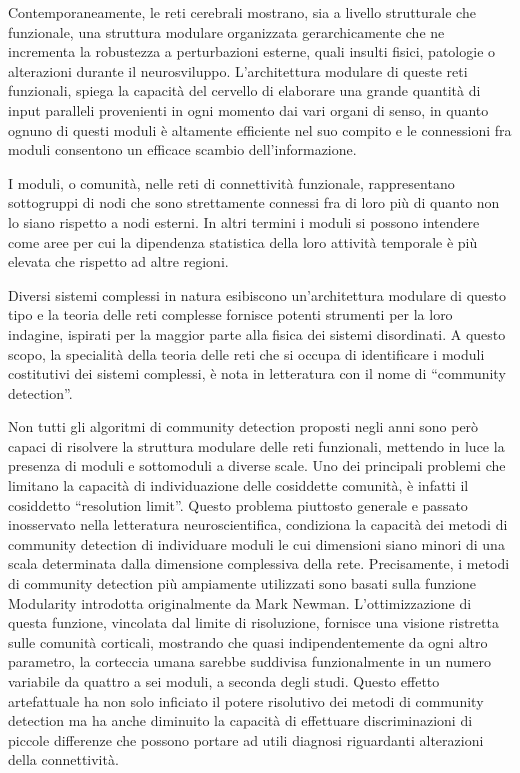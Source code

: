 Contemporaneamente, le reti cerebrali mostrano, sia a livello strutturale che funzionale, una struttura modulare organizzata gerarchicamente che ne incrementa la robustezza a perturbazioni esterne, quali insulti fisici, patologie o alterazioni durante il neurosviluppo.
L'architettura modulare di queste reti funzionali, spiega la capacità del cervello di elaborare una grande quantità di input paralleli provenienti in ogni momento dai vari organi di senso, in quanto ognuno di questi moduli è altamente efficiente nel suo compito e le connessioni fra moduli consentono un efficace scambio dell'informazione.

I moduli, o comunità, nelle reti di connettività funzionale, rappresentano sottogruppi di nodi che sono strettamente connessi fra di loro più di quanto non lo siano rispetto a nodi esterni.
In altri termini i moduli si possono intendere come aree per cui la dipendenza statistica della loro attività temporale è più elevata che rispetto ad altre regioni.

Diversi sistemi complessi in natura esibiscono un'architettura modulare di questo tipo e la teoria delle reti complesse fornisce potenti strumenti per la loro indagine, ispirati per la maggior parte alla fisica dei sistemi disordinati.
A questo scopo, la specialità della teoria delle reti che si occupa di identificare i moduli costitutivi dei sistemi complessi, è nota in letteratura con il nome di ``community detection''.

Non tutti gli algoritmi di community detection proposti negli anni sono però capaci di risolvere la struttura modulare delle reti funzionali, mettendo in luce la presenza di moduli e sottomoduli a diverse scale.
Uno dei principali problemi che limitano la capacità di individuazione delle cosiddette comunità, è infatti il cosiddetto ``resolution limit''.
Questo problema piuttosto generale e passato inosservato nella letteratura neuroscientifica, condiziona la capacità dei metodi di community detection di individuare moduli le cui dimensioni siano minori di una scala determinata dalla dimensione complessiva della rete.
Precisamente, i metodi di community detection più ampiamente utilizzati sono basati sulla funzione Modularity introdotta originalmente da Mark Newman.
L'ottimizzazione di questa funzione, vincolata dal limite di risoluzione, fornisce una visione ristretta sulle comunità corticali, mostrando che quasi indipendentemente da ogni altro parametro, la corteccia umana sarebbe suddivisa funzionalmente in un numero variabile da quattro a sei moduli, a seconda degli studi.
Questo effetto artefattuale ha non solo inficiato il potere risolutivo dei metodi di community detection ma ha anche diminuito la capacità di effettuare discriminazioni di piccole differenze che possono portare ad utili diagnosi riguardanti alterazioni della connettività.

